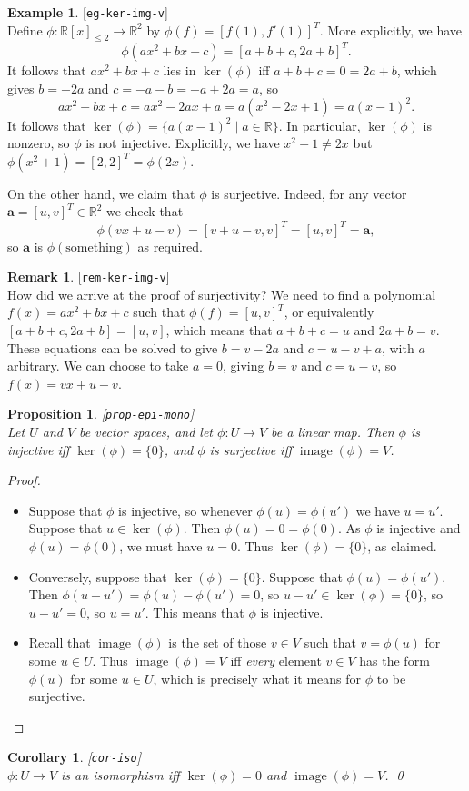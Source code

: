 \documentclass{amsart}
\newcommand{\lbl}[1]{\label{#1}\textup{[\texttt{#1}]}\ \\}
\newcommand{\lbl}{\label}
\newcommand{\R}         {{\mathbb{R}}}
\newcommand{\img}       {\operatorname{image}}
\newcommand{\xra}       {\xrightarrow}
\newcommand{\st}        {\;|\;}
\newcommand{\va}        {\mathbf{a}}
\renewcommand{\:}       {\colon}
\newtheorem{proposition}[theorem]{Proposition}
\newtheorem{corollary}[theorem]{Corollary}
\theoremstyle{definition}
\newtheorem{remark}[theorem]{Remark}
\newtheorem{example}[theorem]{Example}
\begin{document}
\begin{example}\lbl{eg-ker-img-v}
 Define $\phi\:\R[x]_{\leq 2}\to\R^2$ by $\phi(f)=[f(1),f'(1)]^T$.
 More explicitly, we have 
 \[ \phi(ax^2+bx+c) = [a+b+c,2a+b]^T. \]
 It follows that $ax^2+bx+c$ lies in $\ker(\phi)$ iff $a+b+c=0=2a+b$,
 which gives $b=-2a$ and $c=-a-b=-a+2a=a$, so 
 \[ ax^2+bx+c = ax^2-2ax+a = a(x^2-2x+1) = a(x-1)^2. \]
 It follows that $\ker(\phi)=\{a(x-1)^2\st a\in\R\}$.  In particular,
 $\ker(\phi)$ is nonzero, so $\phi$ is not injective.  Explicitly, we
 have $x^2+1\neq 2x$ but $\phi(x^2+1)=[2,2]^T=\phi(2x)$.

 On the other hand, we claim that $\phi$ is surjective.  Indeed, for
 any vector $\va=[u,v]^T\in\R^2$ we check that 
 \[ \phi(vx+u-v) = [v+u-v,v]^T = [u,v]^T = \va, \]
 so $\va$ is $\phi(\text{something})$ as required.
\end{example}
\begin{remark}\lbl{rem-ker-img-v}
 How did we arrive at the proof of surjectivity?  We need to find a
 polynomial $f(x)=ax^2+bx+c$ such that $\phi(f)=[u,v]^T$, or
 equivalently $[a+b+c,2a+b]=[u,v]$, which means that $a+b+c=u$ and
 $2a+b=v$.  These equations can be solved to give $b=v-2a$ and
 $c=u-v+a$, with $a$ arbitrary.  We can choose to take $a=0$, giving
 $b=v$ and $c=u-v$, so $f(x)=vx+u-v$.
\end{remark}




\begin{proposition}\lbl{prop-epi-mono}
 Let $U$ and $V$ be vector spaces, and let $\phi\:U\xra{}V$
 be a linear map.  Then $\phi$ is injective iff
 $\ker(\phi)=\{0\}$, and $\phi$ is surjective iff
 $\img(\phi)=V$.
\end{proposition}
\begin{proof}
 \begin{itemize}
  \item Suppose that $\phi$ is injective, so whenever
   $\phi(u)=\phi(u')$ we have $u=u'$.  Suppose that
   $u\in\ker(\phi)$.  Then $\phi(u)=0=\phi(0)$.  As $\phi$
   is injective and $\phi(u)=\phi(0)$, we must have $u=0$.
   Thus $\ker(\phi)=\{0\}$, as claimed.
  \item Conversely, suppose that $\ker(\phi)=\{0\}$.
   Suppose that $\phi(u)=\phi(u')$.  Then
   $\phi(u-u')=\phi(u)-\phi(u')=0$, so
   $u-u'\in\ker(\phi)=\{0\}$, so $u-u'=0$, so $u=u'$.  This
   means that $\phi$ is injective.
  \item Recall that $\img(\phi)$ is the set of those $v\in V$
   such that $v=\phi(u)$ for some $u\in U$.  Thus
   $\img(\phi)=V$ iff \emph{every} element $v\in V$ has the
   form $\phi(u)$ for some $u\in U$, which is precisely what
   it means for $\phi$ to be surjective.
 \end{itemize}
\end{proof}
\begin{corollary}\lbl{cor-iso}
 $\phi\:U\xra{}V$ is an isomorphism iff $\ker(\phi)=0$ and
 $\img(\phi)=V$. \qed
\end{corollary}
\end{document}
